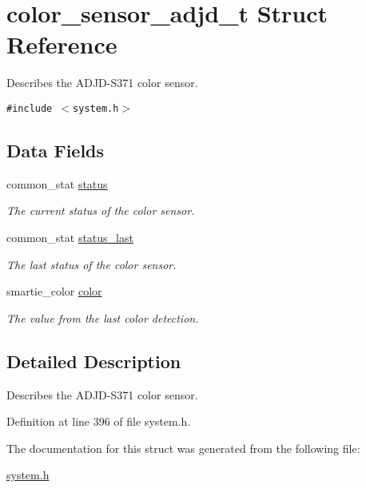 \hypertarget{structcolor__sensor__adjd__t}{
\section{color\_\-sensor\_\-adjd\_\-t Struct Reference}
\label{structcolor__sensor__adjd__t}
}
Describes the ADJD-S371 color sensor.  


{\tt \#include $<$system.h$>$}

\subsection*{Data Fields}
\begin{CompactItemize}
\item 
\hypertarget{structcolor__sensor__adjd__t_9a68510ce77ed9824408724a06982a9c}{
common\_\-stat \hyperlink{structcolor__sensor__adjd__t_9a68510ce77ed9824408724a06982a9c}{status}}
\label{structcolor__sensor__adjd__t_9a68510ce77ed9824408724a06982a9c}

\begin{CompactList}\small\item\em The current status of the color sensor. \item\end{CompactList}\item 
\hypertarget{structcolor__sensor__adjd__t_2946bac9d2bef0a9132825d630eec978}{
common\_\-stat \hyperlink{structcolor__sensor__adjd__t_2946bac9d2bef0a9132825d630eec978}{status\_\-last}}
\label{structcolor__sensor__adjd__t_2946bac9d2bef0a9132825d630eec978}

\begin{CompactList}\small\item\em The last status of the color sensor. \item\end{CompactList}\item 
\hypertarget{structcolor__sensor__adjd__t_24ce0cda961c65e3bea3532249eb43b1}{
smartie\_\-color \hyperlink{structcolor__sensor__adjd__t_24ce0cda961c65e3bea3532249eb43b1}{color}}
\label{structcolor__sensor__adjd__t_24ce0cda961c65e3bea3532249eb43b1}

\begin{CompactList}\small\item\em The value from the last color detection. \item\end{CompactList}\end{CompactItemize}


\subsection{Detailed Description}
Describes the ADJD-S371 color sensor. 

Definition at line 396 of file system.h.

The documentation for this struct was generated from the following file:\begin{CompactItemize}
\item 
\hyperlink{system_8h}{system.h}\end{CompactItemize}
